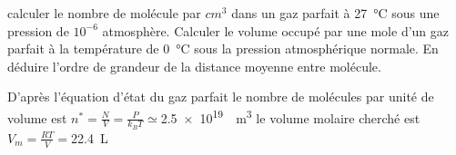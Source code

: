\begin{Exercise}[title=Densité particulaire et volume molaire]
		\Question calculer le nombre de molécule par $cm^3$ dans un gaz parfait à \SI{27}{\degreeCelsius} sous une pression de $10^{-6}$ atmosphère.
		\Question Calculer le volume occupé par une mole d'un gaz parfait à la température de \SI{0}{\degreeCelsius} sous la pression atmosphérique normale. En déduire l'ordre de grandeur de la distance moyenne entre molécule.

\end{Exercise}
\begin{Answer}
		\Question D'après l'équation d'état du gaz parfait le nombre de molécules par unité de volume est $n^*=\frac{N}{V} =\frac{P}{k_BT} \simeq$\SI{2,5e19}{\per\m^3}
		\Question le volume molaire cherché est $V_m =\frac{RT}{V}=$\SI{22,4}{L}
\end{Answer}
